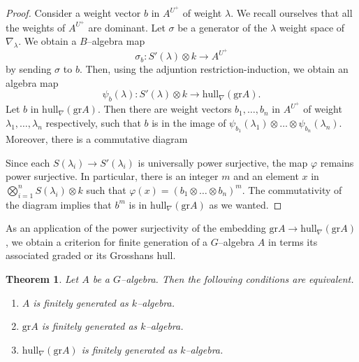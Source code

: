 \documentclass{article}
\theoremstyle{plain}
\newtheorem{Th}{Theorem}[section]
\theoremstyle{definition}
\begin{document}
\begin{proof}
Consider a weight vector $b$ in $A^{U^+}$ of weight $\lambda$. We recall ourselves that all the weights of $A^{U^+}$ are dominant. Let $\sigma$ be a generator of the $\lambda$ weight space of $\nabla_\lambda$. We obtain a $B$--algebra map 
\[
\sigma_b\colon S'(\lambda)\otimes k\to A^{U^+} 
\]
by sending $\sigma$ to $b$. Then, using the adjuntion restriction-induction, we obtain an algebra  map 
\[
\psi_b(\lambda) \colon S'(\lambda)\otimes k\to \mathrm{hull}_\nabla(\mathrm{gr}A). 
\]
Let $b$ in $\mathrm{hull}_\nabla(\mathrm{gr}A)$. Then there are weight vectors $b_1,\ldots,b_n$ in $A^{U^+}$ of weight $\lambda_1,\ldots,\lambda_n$ respectively, such that  $b$ is in the image of $\psi_{b_1}(\lambda_1)\otimes\ldots\otimes \psi_{b_n}(\lambda_n)$. Moreover, there is a commutative diagram 

\begin{center}
\end{center}
Since each $S(\lambda_i) \to S'(\lambda_i)$ is universally power surjective, the map $\varphi$ remains power surjective. In particular, there is an integer $m$ and an element $x$ in  $\bigotimes_{i=1}^n S(\lambda_i)\otimes k$ such that  $\varphi(x)=(b_1\otimes \ldots \otimes b_n)^m$. The commutativity of the diagram implies that $b^m$ is in $\mathrm{hull}_\nabla(\mathrm{gr}A)$ as we wanted. 
\end{proof}





 As an application of the power surjectivity of the embedding $\mathrm{gr}A\to \mathrm{hull}_\nabla(\mathrm{gr}A)$, we obtain a criterion for finite generation of a $G$--algebra $A$ in terms its associated graded or its Grosshans hull.

\begin{Th}\label{A fg grA fg and hullA fg}
    Let $A$ be a $G$--algebra. Then the following conditions are equivalent. 
    \begin{enumerate}
        \item $A$ is finitely generated as $k$--algebra.
        \item $\mathrm{gr}A$  is finitely generated as $k$--algebra.
        \item $\mathrm{hull}_\nabla(\mathrm{gr}A)$ is finitely generated as $k$--algebra.
    \end{enumerate}
\end{Th}
\end{document}
